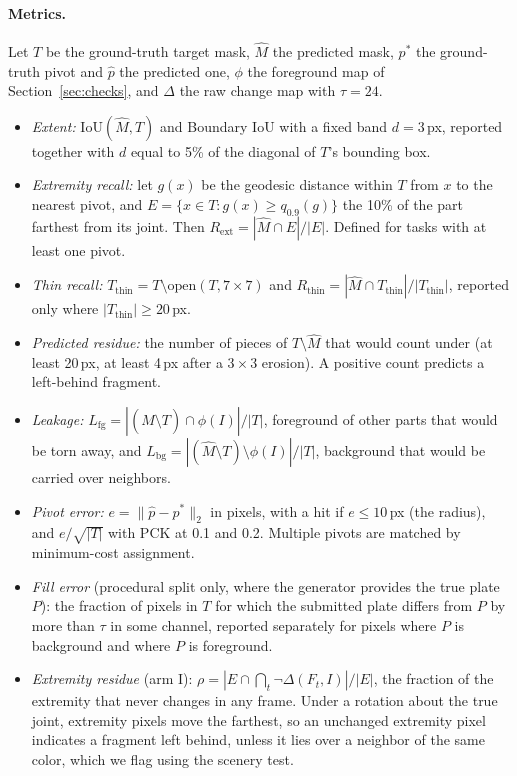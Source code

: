 \paragraph{Metrics.} Let $T$ be the ground-truth target mask, $\hat M$ the predicted mask, $p^\ast$ the ground-truth pivot and $\hat p$ the predicted one, $\phi$ the foreground map of Section~\ref{sec:checks}, and $\Delta$ the raw change map with $\tau=24$.
\begin{itemize}
\item \emph{Extent:} $\mathrm{IoU}(\hat M,T)$ and Boundary IoU with a fixed band $d=3$\,px, reported together with $d$ equal to 5\% of the diagonal of $T$'s bounding box.
\item \emph{Extremity recall:} let $g(x)$ be the geodesic distance within $T$ from $x$ to the nearest pivot, and $E=\{x\in T: g(x)\ge q_{0.9}(g)\}$ the 10\% of the part farthest from its joint. Then $R_{\mathrm{ext}}=|\hat M\cap E|/|E|$. Defined for tasks with at least one pivot.
\item \emph{Thin recall:} $T_{\mathrm{thin}}=T\setminus \mathrm{open}(T,7\times7)$ and $R_{\mathrm{thin}}=|\hat M\cap T_{\mathrm{thin}}|/|T_{\mathrm{thin}}|$, reported only where $|T_{\mathrm{thin}}|\ge 20$\,px.
\item \emph{Predicted residue:} the number of pieces of $T\setminus\hat M$ that would count under  (at least 20\,px, at least 4\,px after a $3\times3$ erosion). A positive count predicts a left-behind fragment.
\item \emph{Leakage:} $L_{\mathrm{fg}}=|(\hat M\setminus T)\cap\phi(I)|/|T|$, foreground of other parts that would be torn away, and $L_{\mathrm{bg}}=|(\hat M\setminus T)\setminus\phi(I)|/|T|$, background that would be carried over neighbors.
\item \emph{Pivot error:} $e=\lVert\hat p-p^\ast\rVert_2$ in pixels, with a hit if $e\le 10$\,px (the  radius), and $e/\sqrt{|T|}$ with PCK at 0.1 and 0.2. Multiple pivots are matched by minimum-cost assignment.
\item \emph{Fill error} (procedural split only, where the generator provides the true plate $P$): the fraction of pixels in $T$ for which the submitted plate differs from $P$ by more than $\tau$ in some channel, reported separately for pixels where $P$ is background and where $P$ is foreground.
\item \emph{Extremity residue} (arm I): $\rho=|E\cap\bigcap_t \neg\Delta(F_t,I)|/|E|$, the fraction of the extremity that never changes in any frame. Under a rotation about the true joint, extremity pixels move the farthest, so an unchanged extremity pixel indicates a fragment left behind, unless it lies over a neighbor of the same color, which we flag using the  scenery test.
\end{itemize}

